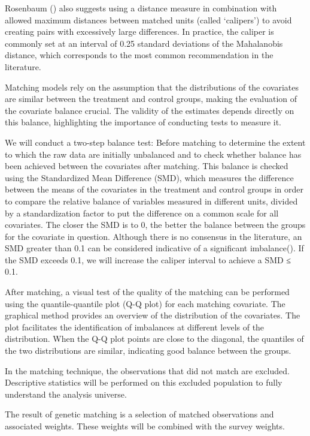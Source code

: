 \documentclass[
]{article}
\begin{document}
Rosenbaum () also suggests
using a distance measure in combination with allowed maximum distances
between matched units (called `calipers') to avoid creating pairs with
excessively large differences. In practice, the caliper is commonly set
at an interval of 0.25 standard deviations of the Mahalanobis distance,
which corresponds to the most common recommendation in the literature.

Matching models rely on the assumption that the distributions of the
covariates are similar between the treatment and control groups, making
the evaluation of the covariate balance crucial. The validity of the
estimates depends directly on this balance, highlighting the importance
of conducting tests to measure it.

We will conduct a two-step balance test: Before matching to determine
the extent to which the raw data are initially unbalanced and to check
whether balance has been achieved between the covariates after matching.
This balance is checked using the Standardized Mean Difference (SMD),
which measures the difference between the means of the covariates in the
treatment and control groups in order to compare the relative balance of
variables measured in different units, divided by a standardization
factor to put the difference on a common scale for all covariates. The
closer the SMD is to 0, the better the balance between the groups for
the covariate in question. Although there is no consensus in the
literature, an SMD greater than 0.1 can be considered indicative of a
significant imbalance().
If the SMD exceeds 0.1, we will increase the caliper interval to achieve
a SMD ≤ 0.1.

After matching, a visual test of the quality of the matching can be
performed using the quantile-quantile plot (Q-Q plot) for each matching
covariate. The graphical method provides an overview of the distribution
of the covariates. The plot facilitates the identification of imbalances
at different levels of the distribution. When the Q-Q plot points are
close to the diagonal, the quantiles of the two distributions are
similar, indicating good balance between the groups.

In the matching technique, the observations that did not match are
excluded. Descriptive statistics will be performed on this excluded
population to fully understand the analysis universe.

The result of genetic matching is a selection of matched observations
and associated weights. These weights will be combined with the survey
weights.
\end{document}
